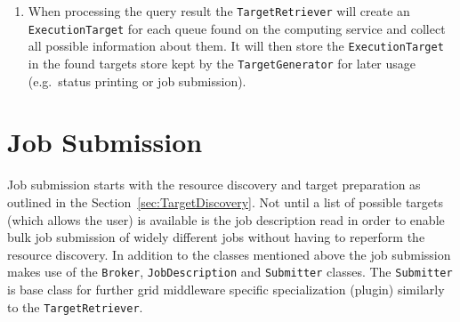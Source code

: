 \documentclass{book}
\newcommand{\Broker}{\texttt{Broker}}
\newcommand{\ExecutionTarget}{\texttt{ExecutionTarget}}
\newcommand{\JobDescription}{\texttt{JobDescription}}
\newcommand{\TargetGenerator}{\texttt{TargetGenerator}}
\newcommand{\TargetRetriever}{\texttt{TargetRetriever}}
\newcommand{\Submitter}{\texttt{Submitter}}
\begin{document}
\begin{enumerate}
{  tries to register at the service store kept by the
  {\TargetGenerator}. If allowed to register, the computing server is
  queried and the query result processed. The {\TargetGenerator} will
  not allow registrations from computing services present in its list
  of rejected computing services or from service that have already
  registered once. Computing services often register at more than one
  index server, thus different {\TargetRetriever}s may discover the
  same service.}
\item{When processing the query result the {\TargetRetriever} will
  create an {\ExecutionTarget} for each queue found on the computing
  service and collect all possible information about them. It will
  then store the {\ExecutionTarget} in the found targets store kept
  by the {\TargetGenerator} for later usage (e.g.\ status printing or
  job submission).}
\end{enumerate}

\section{Job Submission}
\label{sec:JobSubmission}

Job submission starts with the resource discovery and target
preparation as outlined in the Section~\ref{sec:TargetDiscovery}. Not
until a list of possible targets (which allows the user) is available
is the job description read in order to enable bulk job submission of
widely different jobs without having to reperform the resource
discovery. In addition to the classes mentioned above the job
submission makes use of the {\Broker}, {\JobDescription} and
{\Submitter} classes.  The {\Submitter} is base class for further grid
middleware specific specialization (plugin) similarly to the {\TargetRetriever}.

\begin{figure}[ht]
\end{figure}
\end{document}

